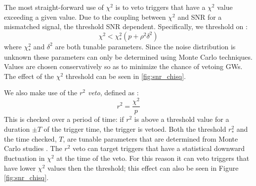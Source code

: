 The most straight-forward use of $\chi^2$ is to veto triggers that have a $\chi^2$ value exceeding a given value. Due to the coupling between $\chi^2$ and \ac{SNR} for a mismatched signal, the threshold \ac{SNR} dependent. Specifically, we threshold on \cite{Brown}:
\begin{equation}
\label{eqn:chisq_threshold}
\chi^2 <  \chi_{*}^2\left(p + \rho^2\delta^2\right)
\end{equation}
where $\chi_{*}^2$ and $\delta^2$ are both tunable parameters. Since the noise distribution is unknown these parameters can only be determined using Monte Carlo techniques. Values are chosen conservatively so as to minimize the chance of vetoing \acp{GW}. The effect of the $\chi^2$ threshold can be seen in \ref{fig:snr_chisq}.

We also make use of the \emph{$r^2$ veto}, defined as \cite{Rodriguez:2007, Keppel:thesis}:
\begin{equation}
\label{eqn:rsq_veto}
r^2 = \frac{\chi^2}{p}
\end{equation}
This is checked over a period of time: if $r^2$ is above a threshold value for a duration $\pm T$ of the trigger time, the trigger is vetoed. Both the threshold $r_{*}^2$ and the time checked, $T$, are tunable parameters that are determined from Monte Carlo studies \cite{Rodriguez:2007}. The $r^2$ veto can target triggers that have a statistical downward fluctuation in $\chi^2$ at the time of the veto. For this reason it can veto triggers that have lower $\chi^2$ values then the threshold; this effect can also be seen in Figure \ref{fig:snr_chisq}. 

